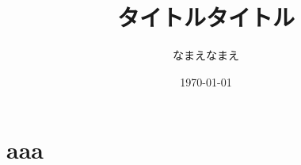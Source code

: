 \documentclass[uplatex,a4paper,11pt]{jsarticle} %
\title{タイトルタイトル}
\author{なまえなまえ}
\date{\today}
\begin{document}

\section{aaa}






% 
\end{document}
